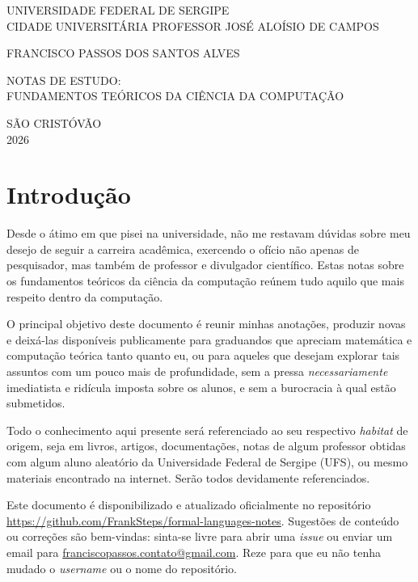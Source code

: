 \documentclass[a4paper,12pt]{article}
\begin{document}
\begin{titlepage}
    \centering

    UNIVERSIDADE FEDERAL DE SERGIPE\\
    CIDADE UNIVERSITÁRIA PROFESSOR JOSÉ ALOÍSIO DE CAMPOS

    \vspace{4cm}

    FRANCISCO PASSOS DOS SANTOS ALVES

    \vspace{4cm}

    NOTAS DE ESTUDO:\\
    FUNDAMENTOS TEÓRICOS DA CIÊNCIA DA COMPUTAÇÃO
    \vfill

    SÃO CRISTÓVÃO\\
    2026

\end{titlepage}


\tableofcontents

\newpage
\section{Introdução}

Desde o átimo em que pisei na universidade, não me restavam dúvidas sobre meu desejo de seguir  a carreira acadêmica, exercendo o ofício não apenas de 
pesquisador, mas também de professor e divulgador científico. Estas notas sobre os fundamentos teóricos da ciência da computação reúnem tudo aquilo que 
mais respeito dentro da computação.

O principal objetivo deste documento é reunir minhas anotações, produzir novas e deixá-las disponíveis publicamente para graduandos que apreciam matemática 
e computação teórica tanto quanto eu, ou para aqueles que desejam explorar tais assuntos com um pouco mais de profundidade, sem a pressa \textit{necessariamente} 
imediatista e ridícula imposta sobre os alunos, e sem a burocracia à qual estão submetidos.

Todo o conhecimento aqui presente será referenciado ao seu respectivo \textit{habitat} de origem, seja em livros, artigos, documentações, notas de algum  professor 
obtidas com algum aluno aleatório da Universidade Federal de Sergipe (UFS), ou mesmo materiais encontrado na internet. Serão todos devidamente referenciados.

Este documento é disponibilizado e atualizado oficialmente no repositório \url{https://github.com/FrankSteps/formal-languages-notes}. Sugestões de conteúdo ou 
correções são bem-vindas: sinta-se livre para abrir uma \textit{issue} ou enviar um email para \href{mailto:franciscopassos.contato@gmail.com}{franciscopassos.contato@gmail.com}. 
Reze para que eu não tenha mudado o \textit{username} ou o nome do repositório.
\end{document}
